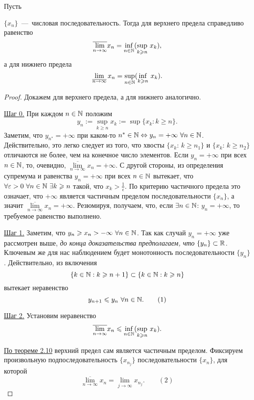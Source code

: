 \begin{theorem}
    \hypertarget{thm2.11}{Пусть} $\{ x_{n} \}$~---~числовая последовательность. Тогда для верхнего предела справедливо равенство
    $$ \overline{\lim\limits_{n\to \infty}} x_{n} = \underset{n \in \mathbb{N}}{\inf} ({\sup\limits_{k \geqslant n}} \  x_{k}),$$
    а для нижнего предела
    $$ \lim\limits_{\overline{n\to \infty}} x_{n} = \underset{n \in \mathbb{N}}{\sup} ({\inf\limits_{k\geqslant n}} \  x_{k}).$$
\end{theorem}
\begin{proof}
    Докажем для верхнего предела, а для нижнего аналогично. 

    \underline{Шаг 0.} При каждом $n \in \mathbb{N}$ положим
    $$ y_{n} := \sup\limits_{k \geq n} x_{k} := \sup \{ x_{k}: k \geq n\}.$$
    Заметим, что $y_{n^{*}} = + \infty$ при каком-то $n^{*} \in \mathbb{N} \Leftrightarrow y_{n} = + \infty \  \forall n \in \mathbb{N}$. Действительно, это легко следует из того, что хвосты $\{ x_{k}$: $k \geq n_{1}\}$ и $\{ x_{k}$: $k \geq n_{2}\}$ отличаются не более, чем на конечное число элементов. Если $y_{n} = + \infty$ при всех $n \in \mathbb{N}$, то, очевидно, $\overline{\lim\limits_{n\to \infty}} x_{n} = + \infty.$ С другой стороны, из определения супремума и равенства $y_{n} = + \infty$ при всех $n \in \mathbb{N}$ вытекает, что $\forall \varepsilon > 0 \  \forall n \in \mathbb{N} \  \exists k \geqslant n$ такой, что $x_{k} > \frac{1}{\epsilon}$. По критерию частичного предела это означает, что $+\infty$ является частичным пределом последовательности $\{ x_{n} \}$, а значит $\overline{\lim\limits_{n\to \infty}} x_{n} = + \infty.$ Резюмируя, получаем, что, если $\exists n \in \mathbb{N}$: $y_{n} = + \infty$, то требуемое равенство выполнено.

    \underline{\hypertarget{\hypertarget{step1}}{Шаг 1.}} Заметим, что $y_{n} \geqslant x_{n} > -\infty \  \forall n \in \mathbb{N}$. Так как случай $y_{n} = +\infty$ уже рассмотрен выше, \textit{до конца доказательства предполагаем, что} $\{ y_{n} \} \subset \mathbb{R}$. Ключевым же для нас наблюдением будет монотонность последовательности $\{ y_{n} \}$. Действительно, из включения
    $$ \{ k \in \mathbb{N}: k \geqslant n + 1 \} \subset \{ k \in \mathbb{N}: k \geqslant n \}$$
    вытекает неравенство
    $$ y_{n + 1} \leqslant y_{n} \  \forall n \in \mathbb{N}. \qquad (1)$$

    \underline{\hypertarget{step2}{Шаг 2.}} Установим неравенство
    $$ \overline{\lim\limits_{n\to \infty}} x_{n} \leqslant \underset{n \in \mathbb{N}}{\inf} ({\sup\limits_{k \geqslant n}} \  x_{k}).$$

    \hyperlink{thm2.10}{По теореме 2.10} верхний предел сам является частичным пределом. Фиксируем произвольную подпоследовательность $\{ x_{n_{j}} \}$ последовательности $\{ x_{n} \}$, для которой
    $$ \overline{\lim\limits_{n\to \infty}} x_{n} = \lim\limits_{j\to \infty} x_{n_{j}}. \qquad (2)$$


\end{proof}
